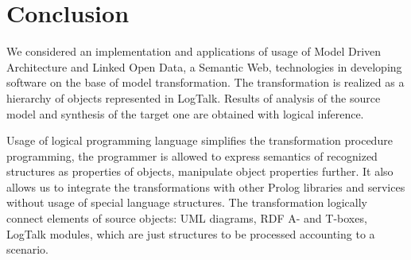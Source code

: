 \documentclass[runningheads]{llncs}
\begin{document}



\section{Conclusion}

We considered an implementation and applications of usage of Model Driven Architecture and Linked Open Data, a Semantic Web, technologies in developing software on the base of model transformation.  The transformation is realized as a hierarchy of objects represented in LogTalk.  Results of analysis of the source model and synthesis of the target one are obtained with logical inference.

Usage of logical programming language simplifies the transformation procedure programming, the programmer is allowed to express semantics of recognized structures as properties of objects, manipulate object properties further. It also allows us to integrate the transformations with other Prolog libraries and services without usage of special language structures. The transformation logically connect elements of source objects: UML diagrams, RDF A- and T-boxes, LogTalk modules, which are just structures to be processed accounting to a scenario.
\end{document}
